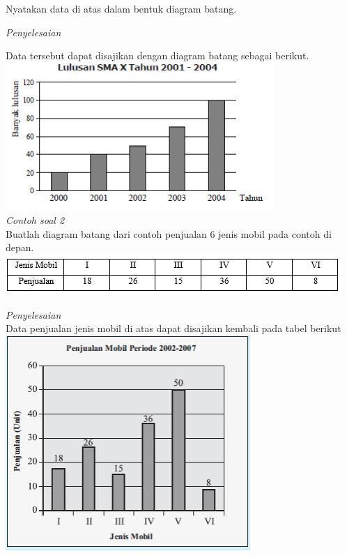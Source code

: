 \documentclass[11pt,fleqn]{book} %
\begin{document}
{Nyatakan data di atas dalam bentuk diagram batang.

\textit{Penyelesaian}

Data tersebut dapat disajikan dengan diagram batang sebagai berikut.\\

\includegraphics[width = 10.2cm, height= 5.6cm]{Pictures/Gb15_diana.png}\\

\textit{Contoh soal 2}\\

Buatlah diagram batang dari contoh penjualan 6 jenis mobil  pada contoh di depan.\\

\includegraphics[width = 12.75cm, height= 1.54cm]{Pictures/Gb10_diana.png}

\textit{Penyelesaian}\\

Data penjualan jenis mobil di atas dapat disajikan kembali pada tabel berikut\\

\includegraphics[width = 9.3cm, height= 8.15cm]{Pictures/Gb20_diana.png}\\

}
\end{document}
